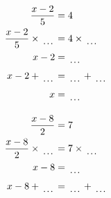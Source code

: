 \documentclass[12pt]{article}
\newcounter{minipagecount}
\begin{document}
\begin{multicols}{2}
\begin{minipage}[t]{0.45\textwidth}
    \raggedright %
    \begin{align*} %
        \frac{x - 2}{5} &= 4\\
        \frac{x - 2}{5} \times\dotuline{\hspace{5mm}} &= 4 \times\dotuline{\hspace{5mm}}\\
        x - 2 &= \dotuline{\hspace{5mm}}\\
        x - 2 + \dotuline{\hspace{5mm}} &= \dotuline{\hspace{5mm}} + \dotuline{\hspace{5mm}}\\
        x &= \dotuline{\hspace{5mm}}\\
    \end{align*}
\end{minipage} %
\noindent{(\theminipagecount)}\hspace{0.1mm} %
\begin{minipage}[t]{0.45\textwidth} %
    \vspace{-26pt}  %
    \raggedright %
    \begin{align*} %
        \frac{x - 8}{2} &= 7\\
        \frac{x - 8}{2} \times\dotuline{\hspace{5mm}} &= 7 \times\dotuline{\hspace{5mm}}\\
        x - 8 &= \dotuline{\hspace{5mm}}\\
        x - 8 + \dotuline{\hspace{5mm}} &= \dotuline{\hspace{5mm}} + \dotuline{\hspace{5mm}}\\

\end{align*}
\end{minipage}
\end{multicols}
\end{document}
